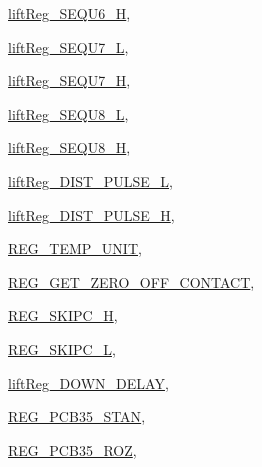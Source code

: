 \begin{DoxyCompactItemize}
\begin{DoxyCompactItemize}
\item\mbox{\hyperlink{classRegister_a6b7cab4f601efc139a6589f92bdd97eaaca109340f2e5dcc46367e65ad04062b3}{lift\+Reg\+\_\+\+S\+E\+Q\+U6\+\_\+H}}, 
\item\mbox{\hyperlink{classRegister_a6b7cab4f601efc139a6589f92bdd97eaa1b70194ec5bf92537d024c1e0ead8665}{lift\+Reg\+\_\+\+S\+E\+Q\+U7\+\_\+L}}, 
\item\mbox{\hyperlink{classRegister_a6b7cab4f601efc139a6589f92bdd97eaa6d793d6c092fa7870dd969fba24ed6d2}{lift\+Reg\+\_\+\+S\+E\+Q\+U7\+\_\+H}}, 
\item\mbox{\hyperlink{classRegister_a6b7cab4f601efc139a6589f92bdd97eaaf71482227d67771897d0b888d804b832}{lift\+Reg\+\_\+\+S\+E\+Q\+U8\+\_\+L}}, 
\item\mbox{\hyperlink{classRegister_a6b7cab4f601efc139a6589f92bdd97eaa1d6c04a2b00fb3504ffdb21c734760da}{lift\+Reg\+\_\+\+S\+E\+Q\+U8\+\_\+H}}, 
\item\mbox{\hyperlink{classRegister_a6b7cab4f601efc139a6589f92bdd97eaa3127f76d6d68960f34822218e5231d44}{lift\+Reg\+\_\+\+D\+I\+S\+T\+\_\+\+P\+U\+L\+S\+E\+\_\+L}}, 
\item\mbox{\hyperlink{classRegister_a6b7cab4f601efc139a6589f92bdd97eaa1f101c522eda2ec92173d127b93ae311}{lift\+Reg\+\_\+\+D\+I\+S\+T\+\_\+\+P\+U\+L\+S\+E\+\_\+H}}, 
\item\mbox{\hyperlink{classRegister_a6b7cab4f601efc139a6589f92bdd97eaa8653d5c27fe231236af81a7562b7ebf2}{R\+E\+G\+\_\+\+T\+E\+M\+P\+\_\+\+U\+N\+IT}}, 
\item\mbox{\hyperlink{classRegister_a6b7cab4f601efc139a6589f92bdd97eaa8428b0dbde8baa35ca18894dc819c6b1}{R\+E\+G\+\_\+\+G\+E\+T\+\_\+\+Z\+E\+R\+O\+\_\+\+O\+F\+F\+\_\+\+C\+O\+N\+T\+A\+CT}}, 
\item\mbox{\hyperlink{classRegister_a6b7cab4f601efc139a6589f92bdd97eaa347d0d1601d8db40c161501ffbdc11a1}{R\+E\+G\+\_\+\+S\+K\+I\+P\+C\+\_\+H}}, 
\item\mbox{\hyperlink{classRegister_a6b7cab4f601efc139a6589f92bdd97eaaf6d7a0d0d81e0461ae1e2d23d4000ff0}{R\+E\+G\+\_\+\+S\+K\+I\+P\+C\+\_\+L}}, 
\item\mbox{\hyperlink{classRegister_a6b7cab4f601efc139a6589f92bdd97eaabb50bdaf3a410e1817bf5f20e3ed6995}{lift\+Reg\+\_\+\+D\+O\+W\+N\+\_\+\+D\+E\+L\+AY}}, 
\item\mbox{\hyperlink{classRegister_a6b7cab4f601efc139a6589f92bdd97eaa9cc528c88fed8cb5bf95982ffe818975}{R\+E\+G\+\_\+\+P\+C\+B35\+\_\+\+S\+T\+AN}}, 
\item\mbox{\hyperlink{classRegister_a6b7cab4f601efc139a6589f92bdd97eaa5ad16a84e0e331329b94bfec88ca2d83}{R\+E\+G\+\_\+\+P\+C\+B35\+\_\+\+R\+OZ}}, 

\end{DoxyCompactItemize}
\end{DoxyCompactItemize}
